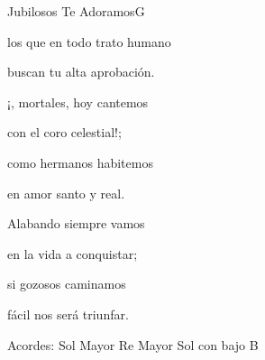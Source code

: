 \documentclass[12pt, spanish]{book}
\begin{document}
\begin{song}{Jubilosos Te Adoramos}{G}
\begin{SBOpGroup}
            los que en todo trato humano

            buscan tu alta aprobación.
        \end{SBOpGroup}

        \begin{SBOpGroup}
            ¡, mortales, hoy cantemos

            con el coro celestial!;

            como hermanos habitemos

            en amor santo y real.

            Alabando siempre vamos

            en la vida a conquistar;

            si gozosos caminamos

            fácil nos será triunfar.
        \end{SBOpGroup}

        \ifChordBk
        \begin{SBOpGroup}
            Acordes:
            \upchord{\G}\qquad Sol Mayor \hfill
            \upchord{\D}\qquad Re Mayor \hfill\null\break
            \upchord{\GB}\qquad Sol con bajo B \hfill
        \end{SBOpGroup}
        \fi
    \end{song}
\end{document}
